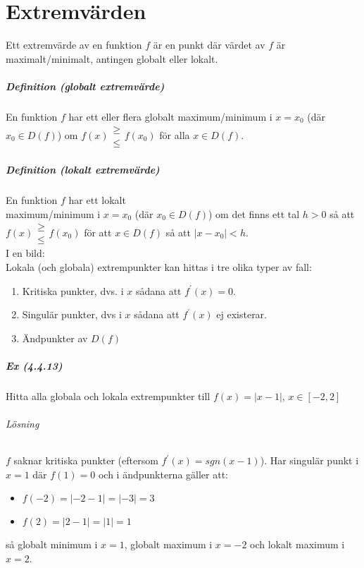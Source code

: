 \chapter{Extremvärden}
Ett extremvärde av en funktion $f$ är en punkt där värdet av $f$ är \\
maximalt/minimalt, antingen globalt eller lokalt.

\paragraph{Definition (globalt extremvärde)} En funktion $f$ har ett eller flera globalt maximum/minimum i $x=x_0$ (där $x_0\in D(f)$) om $f(x)\begin{matrix}\geq\\\leq\end{matrix}f(x_0)$ för alla $x\in D(f)$.

\paragraph{Definition (lokalt extremvärde)} En funktion $f$ har ett lokalt \\
maximum/minimum i $x=x_0$ (där $x_0\in D(f)$) om det finns ett tal $h>0$ så att $f(x)\begin{matrix}\geq\\\leq\end{matrix} f(x_0)$ för att $x\in D(f)$ så att $|x-x_0|<h$.\\
I en bild:\\
Lokala (och globala) extrempunkter kan hittas i tre olika typer av fall:
\begin{enumerate}
    \item Kritiska punkter, dvs. i $x$ sådana att $f^\prime(x)=0$.
    \item Singulär punkter, dvs i $x$ sådana att $f^\prime(x)$ ej existerar.
    \item Ändpunkter av $D(f)$
\end{enumerate}

\paragraph{Ex (4.4.13)} Hitta alla globala och lokala extrempunkter till $f(x)= |x-1|$, $x\in[-2,2]$
\subparagraph{Lösning} $f$ saknar kritiska punkter (eftersom $f^\prime(x)=sgn(x-1)$).
Har singulär punkt i $x=1$ där $f(1)=0$ och i ändpunkterna gäller att:
\begin{itemize}
    \item $f(-2)= | -2-1| = | -3|=3$
    \item $f(2)= | 2-1| = |1| = 1$
\end{itemize}
så globalt minimum i $x=1$, globalt maximum i $x=-2$ och lokalt maximum i $x=2$.
